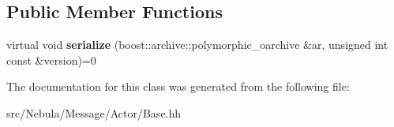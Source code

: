 \subsection*{\-Public \-Member \-Functions}
\begin{DoxyCompactItemize}
\item 
\hypertarget{classNeb_1_1Message_1_1Actor_1_1OBase_a09a771aa2ecd5a83e9c152aa6683e7c2}{virtual void {\bfseries serialize} (boost\-::archive\-::polymorphic\-\_\-oarchive \&ar, unsigned int const \&version)=0}\label{classNeb_1_1Message_1_1Actor_1_1OBase_a09a771aa2ecd5a83e9c152aa6683e7c2}

\end{DoxyCompactItemize}


\-The documentation for this class was generated from the following file\-:\begin{DoxyCompactItemize}
\item 
src/\-Nebula/\-Message/\-Actor/\-Base.\-hh\end{DoxyCompactItemize}
